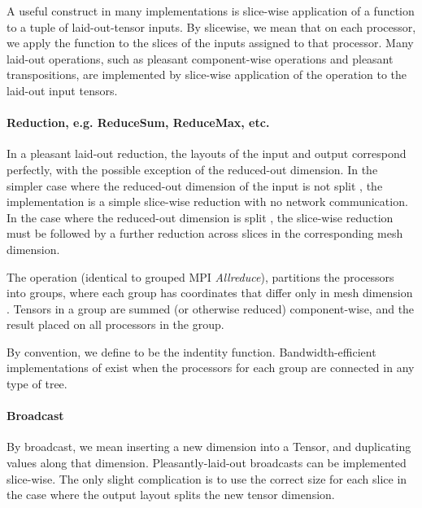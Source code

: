 \documentclass{article}
\begin{document}
\begin{itemize}
A useful construct in many implementations is slice-wise application of a function to a tuple of laid-out-tensor inputs.  By slicewise, we mean that on each processor, we apply the function to the slices of the inputs assigned to that processor.   Many laid-out operations, such as pleasant component-wise operations and pleasant transpositions, are implemented by slice-wise application of the operation to the laid-out input tensors.







\paragraph{Reduction, e.g. ReduceSum, ReduceMax, etc.}

In a pleasant laid-out reduction, the layouts of the input and output correspond perfectly, with the possible exception of the reduced-out dimension. In the simpler case where the reduced-out dimension of the input is not split , the implementation is a simple slice-wise reduction with no network communication.  In the case where the reduced-out dimension is split , the slice-wise reduction must be followed by a further reduction across slices in the corresponding mesh dimension.  





The  operation (identical to grouped MPI \textit{Allreduce}), partitions the processors into groups, where each group has coordinates that differ only in mesh dimension .  Tensors in a group are summed (or otherwise reduced) component-wise, and the result placed on all processors in the group.  



By convention, we define  to be the indentity function.  Bandwidth-efficient implementations of  exist when the processors for each group are connected in any type of tree. \cite{Patarasuk2009} \cite{Jain10y.:optimal}

\paragraph{Broadcast}
By broadcast, we mean inserting a new dimension into a Tensor, and duplicating values along that dimension.  Pleasantly-laid-out broadcasts can be implemented slice-wise.  The only slight complication is to use the correct size for each slice in the case where the output layout splits the new tensor dimension.


\end{itemize}
\end{document}
